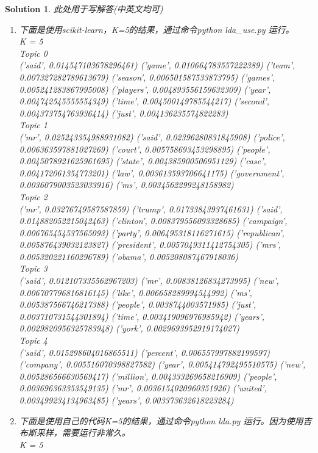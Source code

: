 \documentclass[a4paper,UTF8]{article}
\newtheorem*{solution}{Solution}
\numberwithin{equation}{section}
\begin{document}
\begin{solution}
此处用于写解答(中英文均可)
\begin{enumerate}
	\item 
	下面是使用scikit-learn，K=5的结果，通过命令python lda\_use.py 运行。\\
	K = 5 \\
	Topic 0 \\
	('said', 0.014547103678296461) ('game', 0.010664783557222389) ('team', 0.007327282789613679) ('season', 0.006501587533873795) ('games', 0.005241283867995008) ('players', 0.004893556159632309) ('year', 0.004742545555554349) ('time', 0.004500149785544217) ('second', 0.004373754763936414) ('just', 0.004136235574822283) \\
	Topic 1 \\
	('mr', 0.025243354988931082) ('said', 0.02396280831845908) ('police', 0.006363597881027269) ('court', 0.005758693453298895) ('people', 0.0045078921625961695) ('state', 0.004385900506951129) ('case', 0.004172061354773201) ('law', 0.003613593706641175) ('government', 0.0036079003523033916) ('ms', 0.0034562299248158982) \\
	Topic 2 \\
	('mr', 0.03276749587587859) ('trump', 0.01733843937461631) ('said', 0.014882052215042463) ('clinton', 0.008379556093328685) ('campaign', 0.006765454537565093) ('party', 0.006495318116271615) ('republican', 0.005876439032123827) ('president', 0.0057049311412754305) ('mrs', 0.005320221160296789) ('obama', 0.005208087467918036) \\
	Topic 3 \\
	('said', 0.012107335562967203) ('mr', 0.00838126834273995) ('new', 0.006707796816816145) ('like', 0.006658289994544992) ('ms', 0.005387566746217388) ('people', 0.0038744003571985) ('just', 0.003710731544301894) ('time', 0.003419096976985942) ('years', 0.0029820956325783948) ('york', 0.0029693952919174027) \\
	Topic 4 \\
	('said', 0.015298604016865511) ('percent', 0.006557997882199597) ('company', 0.005516070398827582) ('year', 0.005414792495510575) ('new', 0.005286566630569417) ('million', 0.004333269658216909) ('people', 0.003696363353549135) ('mr', 0.0036154020960351926) ('united', 0.003499234134963485) ('years', 0.003373632618223284)
	\item 
	下面是使用自己的代码K=5的结果，通过命令python lda.py 运行。因为使用吉布斯采样，需要运行非常久。\\
	K = 5 \\

\end{enumerate}
\end{solution}
\end{document}
